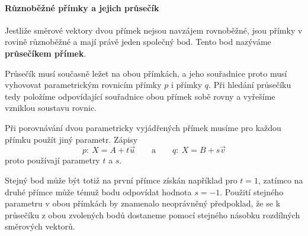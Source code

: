 \paragraph{Různoběžné přímky a jejich průsečík}

Jestliže směrové vektory dvou přímek nejsou navzájem rovnoběžné, jsou
přímky v rovině různoběžné a mají právě jeden společný bod. Tento bod
nazýváme \textbf{průsečíkem přímek}.

Průsečík musí současně ležet na obou přímkách, a jeho souřadnice proto
musí vyhovovat parametrickým rovnicím přímky $p$ i přímky $q$. Při
hledání průsečíku tedy položíme odpovídající souřadnice obou přímek
sobě rovny a vyřešíme vzniklou soustavu rovnic.

\begin{remark}\label{rem:Different_parameters_parametric_lines}
    Při porovnávání dvou parametricky vyjádřených přímek musíme pro
    každou přímku použít jiný parametr. Zápisy
    \[
        p:\ X=A+t\vec{u}
        \qquad\text{a}\qquad
        q:\ X=B+s\vec{v}
    \]
    proto používají parametry $t$ a $s$.

    Stejný bod může být totiž na první přímce získán například pro
    $t=1$, zatímco na druhé přímce může témuž bodu odpovídat hodnota
    $s=-1$. Použití stejného parametru v obou přímkách by znamenalo
    neoprávněný předpoklad, že se k průsečíku z obou zvolených bodů
    dostaneme pomocí stejného násobku rozdílných směrových vektorů.
\end{remark}

